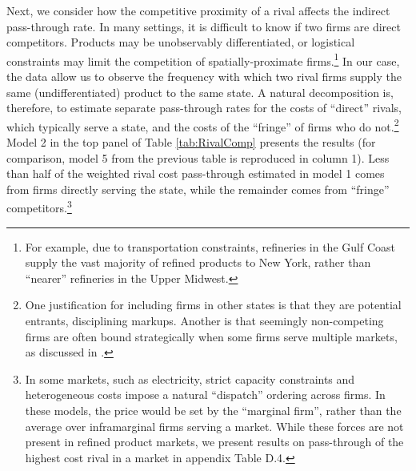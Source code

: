 \documentclass[12pt]{article}
\newcommand{\tablepath}{../output/offline/tables}
\begin{document}
Next, we consider how the competitive proximity of a rival affects the indirect pass-through rate. In many settings, it is difficult to know if two firms are direct competitors. Products may be unobservably differentiated, or logistical constraints may limit the competition of spatially-proximate firms.\footnote{For example, due to transportation constraints, refineries in the Gulf Coast supply the vast majority of refined products to New York, rather than ``nearer'' refineries in the Upper Midwest.} In our case, the data allow us to observe the frequency with which two rival firms supply the same (undifferentiated) product to the same state. A natural decomposition is, therefore, to estimate separate pass-through rates for the costs of ``direct'' rivals, which typically serve a state, and the costs of the ``fringe'' of firms who do not.\footnote{One justification for including firms in other states is that they are potential entrants, disciplining markups. Another is that seemingly non-competing firms are often bound strategically when some firms serve multiple markets, as discussed in \citep{bulow_multimarket_1985}.} Model 2 in the top panel of Table \ref{tab:RivalComp} presents the results (for comparison, model 5 from the previous table is reproduced in column 1). Less than half of the weighted rival cost pass-through estimated in model 1 comes from firms directly serving the state, while the remainder comes from ``fringe'' competitors.\footnote{In some markets, such as electricity, strict capacity constraints and heterogeneous costs impose a natural ``dispatch'' ordering across firms. In these models, the price would be set by the ``marginal firm'', rather than the average over inframarginal firms serving a market. While these forces are not present in refined product markets, we present results on pass-through of the highest cost rival in a market in appendix Table D.4.}



\clearpage
\end{document}
